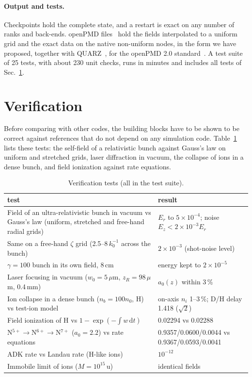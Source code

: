 \documentclass[aps,prab,reprint,floatfix,superscriptaddress,amsmath,amssymb]{revtex4-2}
\newcommand{\dd}{\mathrm{d}}
\begin{document}
\paragraph*{Output and tests.} Checkpoints hold the complete state, and a restart is exact on any number of ranks and back-ends. openPMD files~\cite{openPMD} hold the fields interpolated to a uniform grid and the exact data on the native non-uniform nodes, in the form we have proposed, together with QUARZ~\cite{QUARZ}, for the openPMD 2.0 standard~\cite{openPMDPR}. A test suite of 25 tests, with about 230 unit checks, runs in minutes and includes all tests of Sec.~\ref{sec:valid}.

\section{Verification}\label{sec:valid}

Before comparing with other codes, the building blocks have to be shown to be correct against references that do not depend on any simulation code. Table~\ref{tab:tests} lists these tests: the self-field of a relativistic bunch against Gauss's law on uniform and stretched grids, laser diffraction in vacuum, the collapse of ions in a dense bunch, and field ionization against rate equations.

\begin{table}[htb]
\caption{Verification tests (all in the test suite).}\label{tab:tests}
\begin{ruledtabular}
\begin{tabular}{p{}p{}}
test & result \\ \hline
Field of an ultra-relativistic bunch in vacuum vs Gauss's law (uniform, stretched and free-hand radial grids) & $E_r$ to $5\times10^{-4}$; noise $E_z < 2\times10^{-3}E_r$ \\
Same on a free-hand $\zeta$ grid (2.5--8\,$k_0^{-1}$ across the bunch) & $2\times10^{-3}$ (shot-noise level) \\
$\gamma = 100$ bunch in its own field, 8\,cm & energy kept to $2\times10^{-5}$ \\
Laser focusing in vacuum ($w_0 = 5\,\mu$m, $z_R = 98\,\mu$m, 0.4\,mm) & $a_0(z)$ within 3\,\% \\
Ion collapse in a dense bunch ($n_b = 100 n_0$, H)~\cite{Rosenzweig2005} vs test-ion model & on-axis $n_i$ 1--3\,\%; D/H delay 1.418 ($\sqrt2$) \\
Field ionization of H vs $1 - \exp(-\int w\,\dd t)$ & 0.02294 vs 0.02288 \\
N$^{5+}\to$N$^{6+}\to$N$^{7+}$ ($a_0 = 2.2$) vs rate equations & 0.9357/0.0600/0.0044 vs 0.9367/0.0593/0.0041 \\
ADK rate vs Landau rate (H-like ions) & $10^{-12}$ \\
Immobile limit of ions ($M = 10^{15}$\,u) & identical fields \\
\end{tabular}
\end{ruledtabular}
\end{table}
\end{document}
